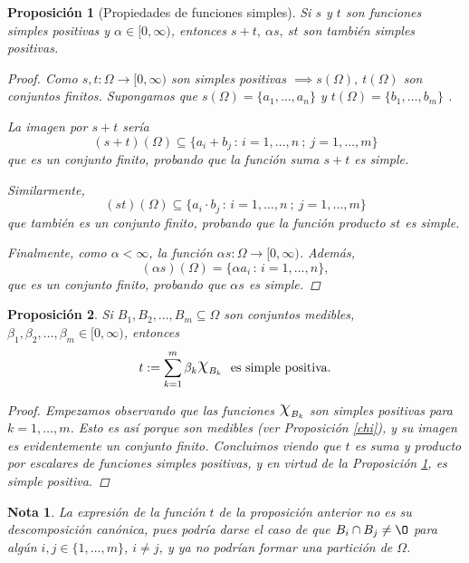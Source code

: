 \documentclass[11pt, a4paper]{article}
\DeclareRobustCommand{\rchi}{{\Large \mathpalette\irchi\relax}}
\newcommand{\irchi}[2]{\raisebox{0.6\depth}{$#1\chi$}} %
\theoremstyle{theorem-style}
\newtheorem{nprop}{Proposición}[section]
\theoremstyle{definition-style}
\theoremstyle{remark-style}
\newtheorem*{nota}{Nota}
\theoremstyle{example-style}
\begin{document}
\begin{nprop}[Propiedades de funciones simples] \label{propsimples}
  Si $s$ y $t$ son funciones simples positivas y $\alpha \in [0,\infty)$, entonces $s+t, \ \alpha s, \ st$ son también simples positivas.
  
  \begin{proof}
    Como $s,t: \Omega \longrightarrow [0,\infty)$ son simples positivas $\implies s(\Omega) , \ t(\Omega)$ son conjuntos finitos. Supongamos que $s(\Omega) =\{ a_1, \dots ,a_n\}$  y $t(\Omega) = \{ b_1, \dots ,b_m\}$ . 

    La imagen por $s+ t$ sería
    $$(s+t)(\Omega) \subseteq \{ a_i + b_j \, :\, i=1,\dots ,n \ ; \ j=1,\dots ,m\}$$
    que es un conjunto finito, probando que la función suma $s+t$ es simple.

    Similarmente, $$(st)(\Omega ) \subseteq \{ a_i \cdot b_j \, : \, i=1,\dots ,n \ ; \ j=1,\dots ,m \}$$
    que también es un conjunto finito, probando que la función producto $st$ es simple.

    Finalmente, como $\alpha< \infty$, la función $\alpha s:\Omega \longrightarrow [0,\infty)$. Además, 
    $$(\alpha s)(\Omega) = \{ \alpha a_i \,:\, i=1,\dots ,n \},$$
    que es un  conjunto finito, probando que $\alpha s$ es simple.
  \end{proof}
\end{nprop}

\begin{nprop}
Si $B_1, B_2,\dots ,B_m \subseteq \Omega$ son conjuntos medibles,
$\beta_1,\beta_2,\dots,\beta_m \in[0,\infty)$, entonces $$t:= \sum_{k=1}^{m}  \beta_k \rchi_{B_k} \ \ \text{es simple positiva.}$$

\begin{proof}
	Empezamos observando que las funciones $\rchi_{B_k}$ son simples positivas para $k=1,\dots,m$. Esto es así porque son medibles (ver \textit{Proposición \ref{chi}}), y su imagen es evidentemente un conjunto finito. Concluimos viendo que $t$ es suma y producto por escalares de funciones simples positivas, y en virtud de la \textit{Proposición \ref{propsimples}}, es simple positiva.
\end{proof}
\end{nprop}

\begin{nota}
	La expresión de la función $t$ de la proposición anterior no es su descomposición canónica, pues podría darse el caso de que $B_i \cap B_j \neq \O$ para algún $i,j \in \{1,\dots,m\}$, $i\neq j$, y ya no podrían formar una partición de $\Omega$.
\end{nota}
\end{document}
